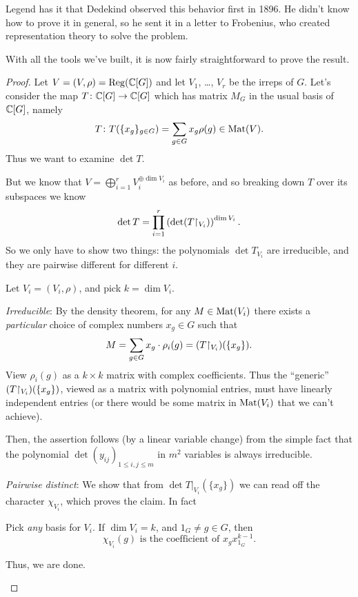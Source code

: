 Legend has it that Dedekind observed this behavior first in 1896.
He didn't know how to prove it in general,
so he sent it in a letter to Frobenius,
who created representation theory to solve the problem.

With all the tools we've built, it is now fairly straightforward
to prove the result.

\begin{proof}
	Let $V = (V, \rho) = \operatorname{Reg}(\mathbb C[G])$ and let $V_1$, \dots, $V_r$
	be the irreps of $G$.
	Let's consider the map $T \colon \mathbb C[G] \to \mathbb C[G]$
	which has matrix $M_G$ in the usual basis of $\mathbb C[G]$, namely
	\[ T \colon T(\{x_g\}_{g \in G}) = \sum_{g \in G} x_g \rho(g) \in \mathrm{Mat}(V). \]
	Thus we want to examine $\det T$.

	But we know that $V = \bigoplus_{i=1}^r V_i^{\oplus \dim V_i}$
	as before, and so breaking down $T$ over its subspaces we know
	\[
		\det T
		= \prod_{i=1}^r \left( \det (T \restrict{V_i})  \right)^{\dim V_i}.
	\]
	So we only have to show two things:
	the polynomials $\det T_{V_i}$ are irreducible,
	and they are pairwise different for different $i$.

	Let $V_i = (V_i, \rho)$, and pick $k = \dim V_i$.
	\begin{itemize}
		\ii \emph{Irreducible}:
		By the density theorem, for any $M \in \mathrm{Mat}(V_i)$ there exists
		a \emph{particular} choice of complex numbers $x_g \in G$ such that
		\[
			M = \sum_{g \in G} x_g
			\cdot \rho_i(g)
			= (T \restrict{V_i})(\{x_g\}).
		\]
		View $\rho_i(g)$ as a $k \times k$ matrix with complex coefficients.
		Thus the ``generic'' $(T \restrict{V_i})(\{x_g\})$, viewed as a matrix with
		polynomial entries, must have linearly independent entries
		(or there would be some matrix in $\mathrm{Mat}(V_i)$ that we can't achieve).

		Then, the assertion follows (by a linear variable change)
		from the simple fact that the polynomial
		$\det (y_{ij})_{1 \le i, j \le m}$ in $m^2$ variables
		is always irreducible.

		\ii \emph{Pairwise distinct}:
		We show that from $\det T|_{V_i}(\{x_g\})$ we can read
		off the character $\chi_{V_i}$, which proves the claim.
		In fact
		\begin{exercise}
			Pick \emph{any} basis for $V_i$.
			If $\dim V_i = k$, and $1_G \neq g \in G$, then
			\[
				\chi_{V_i} (g)
				\text{ is the coefficient of } x_g x_{1_G}^{k-1}.
			\]
		\end{exercise}
		Thus, we are done. \qedhere
	\end{itemize}
\end{proof}
